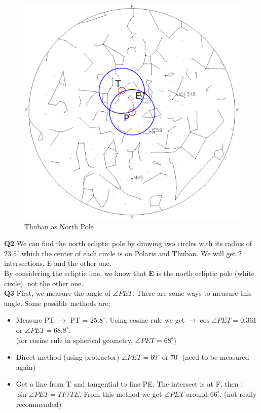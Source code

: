 \documentclass[a4paper,12pt]{extarticle}
\begin{document}
\begin{sol}
	\begin{figure}[H]
		\centering
		\includegraphics[width=0.8\linewidth]{thuban.png}
		\caption{Thuban as North Pole}
		\label{precession}
	\end{figure}
\textbf{Q2} We can find the north ecliptic pole by drawing two circles with its radius of $23.5^\circ$ which the center of each circle is on Polaris and Thuban. We will get 2 intersections, E and the other one.\\
By considering the ecliptic line, we know that \textbf{E} is the north ecliptic pole (white circle), not the other one.\\

\textbf{Q3} First, we measure the angle of $\angle PET$. There are some ways to measure this angle. Some possible methods are:
\begin{itemize}
	\item Measure PT $\rightarrow$ PT = $25.8^\circ$.
	Using cosine rule we get $\rightarrow \cos\angle PET =0.361$ or $\angle PET= 68.8^\circ$.\\
	(for cosine rule in spherical geometry, $\angle PET= 68^\circ$)
	\item Direct method (using protractor) $\angle PET= 69^\circ\; \text{or} \; 70^\circ$ (need to be measured again)
	\item Get a line from T and tangential to line PE. The intersect is at F, then : $\sin\angle PET = TF/TE$. From this method we get $\angle PET$ around $66^\circ$. (not really recommended)
\end{itemize}


\end{sol}
\end{document}
